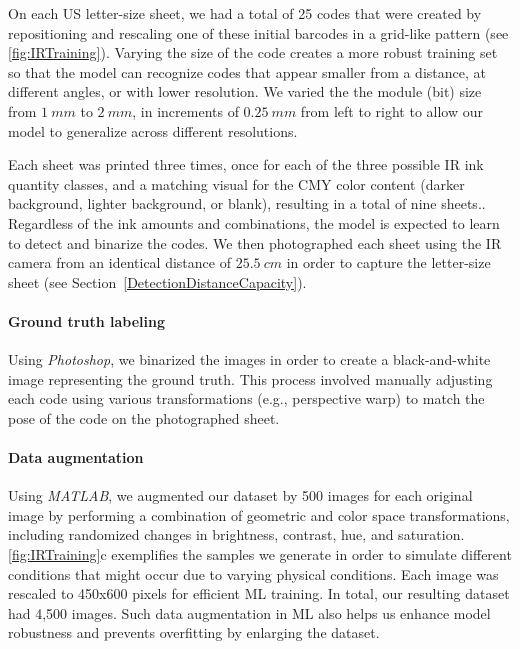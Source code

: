 On each US letter-size sheet, we had a total of 25 codes that were created by repositioning and rescaling one of these initial barcodes in a grid-like pattern (see \autoref{fig:IRTraining}).
Varying the size of the code creates a more robust training set so that the model can recognize codes that appear smaller from a distance, at different angles, or with lower resolution.
We varied the the module (bit) size from $1~mm$ to $2~mm$, in increments of $0.25~mm$ from left to right to allow our model to generalize across different resolutions.

Each sheet was printed three times, once for each of the three possible IR ink quantity classes, and a matching visual for the CMY color content (darker background, lighter background, or blank), resulting in a total of nine sheets..
Regardless of the ink amounts and combinations, the model is expected to learn to detect and binarize the codes.
We then photographed each sheet using the IR camera from an identical distance of $25.5~cm$ in order to capture the letter-size sheet (see Section~\ref{DetectionDistanceCapacity}).



\paragraph{Ground truth labeling}

Using \textit{Photoshop}, we binarized the images in order to create a black-and-white image representing the ground truth. This process involved manually adjusting each code using various transformations (e.g., perspective warp) to match the pose of the code on the photographed sheet.

\paragraph{Data augmentation}

Using \textit{MATLAB}, we augmented our dataset by 500 images for each original image by performing a combination of geometric and color space transformations, including randomized changes in brightness, contrast, hue, and saturation.
\autoref{fig:IRTraining}c exemplifies the samples we generate in order to simulate different conditions that might occur due to varying physical conditions. 
Each image was rescaled to 450x600 pixels for efficient ML training.
In total, our resulting dataset had 4,500 images.
Such data augmentation in ML also helps us enhance model robustness and prevents overfitting by enlarging the dataset.
 




